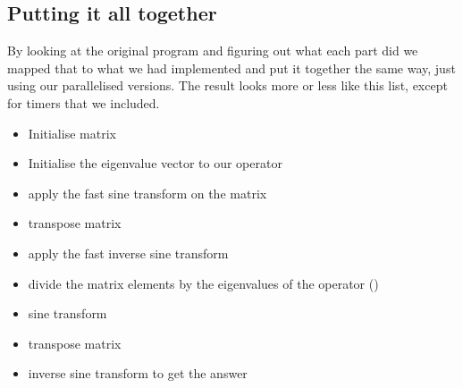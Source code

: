 \subsection{Putting it all together} 
By looking at the original program and figuring out what each part did we
mapped that to what we had implemented and put it together the same way, just
using our parallelised versions. The result looks more or less like this list,
except for timers that we included. 

\begin{itemize}
\item Initialise matrix
\item Initialise the eigenvalue vector to our operator
\item apply the fast sine transform on the matrix
\item transpose matrix
\item apply the fast inverse sine transform
\item divide the matrix elements by the eigenvalues of the operator ()
\item sine transform
\item transpose matrix
\item inverse sine transform to get the answer
\end{itemize}
